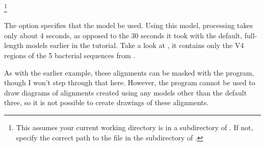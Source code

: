 \footnote{This assumes your
  current working directory is in a subdirectory of .
  If not, specify the correct path to the  file
  in the  subdirectory of .}

The  option specifies that the model  be used. 
Using this model, processing  takes only about 4
seconds, as opposed to the 30 seconds it took with the default,
full-length models earlier in the tutorial. Take a look at
, it contains only the V4 regions
of the 5 bacterial sequences from . 

As with the earlier example, these alignments can be masked with the
 program, though I won't step through that
here. However, the  program cannot be used to draw
diagrams of alignments created using any models other than the default
three, so it is not possible to create drawings of these alignments.


